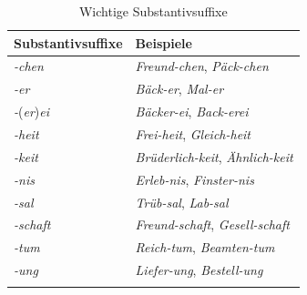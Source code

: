 \begin{table}[!htbp]
  \centering
  \begin{tabular}{l l}
    \lsptoprule
    Substantivsuffixe & Beispiele \\
    \hline
    
    \textit{-chen} & \textit{Freund-chen}, \textit{Päck-chen}\\
    
    \textit{-er} & \textit{Bäck-er}, \textit{Mal-er}\\
    
    \textit{-}(\textit{er})\textit{ei} & \textit{Bäcker-ei}, \textit{Back-erei}\\
    
    \textit{-heit} & \textit{Frei-heit}, \textit{Gleich-heit}\\
    
    \textit{-keit} & \textit{Brüderlich-keit}, \textit{Ähnlich-keit}\\
    
    \textit{-nis} & \textit{Erleb-nis}, \textit{Finster-nis}\\
    
    \textit{-sal} & \textit{Trüb-sal}, \textit{Lab-sal}\\
    
    \textit{-schaft} & \textit{Freund-schaft}, \textit{Gesell-schaft}\\
    
    \textit{-tum} & \textit{Reich-tum}, \textit{Beamten-tum}\\
    
    \textit{-ung} & \textit{Liefer-ung}, \textit{Bestell-ung}\\
    
    \lspbottomrule 
  \end{tabular}
  \caption{Wichtige Substantivsuffixe}
  \label{tab:Substantivsuffixe}
\end{table}


